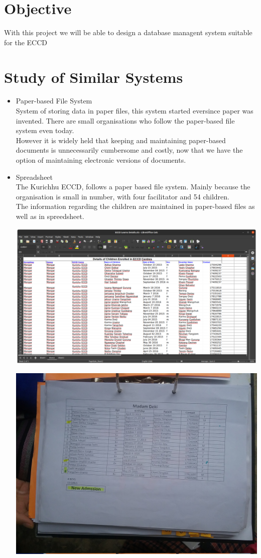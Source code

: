 \documentclass{scrreprt}
\begin{document}
	\section{Objective}
With this project we will be able to design a database managent system suitable for the ECCD


	\section{Study of Similar Systems}
	\begin{itemize}
		\item Paper-based File System\\System of storing data in paper files, this system started eversince paper was invented. There are small organisations who follow the paper-based file system even today. \\However it is widely held that keeping and maintaining paper-based documents is unnecessarily cumbersome and costly, now that we have the option of maintaining electronic versions of documents.
		
	
		\item Spreadsheet\\The Kurichhu ECCD, follows a paper based file system. Mainly because the organisation is small in number, with four facilitator and 54 children. \\The information regarding the children are maintained in paper-based files as well as in spreedsheet.
		
  		\includegraphics[scale=0.2]{c}
 			
  		\includegraphics[scale=0.2]{8}
  		

\end{itemize}
\end{document}
